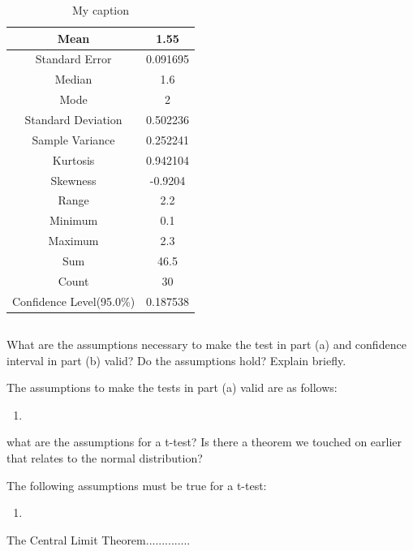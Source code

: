 \documentclass[letterpaper]{article}
\begin{document}
\begin{table}[H]
 \centering
 \begin{tabular}{|c|c|}
  \hline
  Mean                     & 1.55     \\ \hline
  Standard Error           & 0.091695 \\ \hline
  Median                   & 1.6      \\ \hline
  Mode                     & 2        \\ \hline
  Standard Deviation       & 0.502236 \\ \hline
  Sample Variance          & 0.252241 \\ \hline
  Kurtosis                 & 0.942104 \\ \hline
  Skewness                 & -0.9204  \\ \hline
  Range                    & 2.2      \\ \hline
  Minimum                  & 0.1      \\ \hline
  Maximum                  & 2.3      \\ \hline
  Sum                      & 46.5     \\ \hline
  Count                    & 30       \\ \hline
  Confidence Level(95.0\%) & 0.187538 \\ \hline
 \end{tabular}
 \caption{My caption}
 \label{my-label}
\end{table}

\subsection{}%
What are the  assumptions necessary to make the test in part (a) and confidence
interval in part (b)  valid?  Do the assumptions hold?  Explain briefly.

The assumptions to make the tests in part (a) valid are as follows:

\begin{enumerate}
 \item
\end{enumerate}

what are the assumptions for a t-test? Is there a theorem we touched on earlier
that relates to the normal distribution?

The following assumptions must be true for a t-test:
\begin{enumerate}
 \item
\end{enumerate}
The Central Limit Theorem..............
\end{document}
